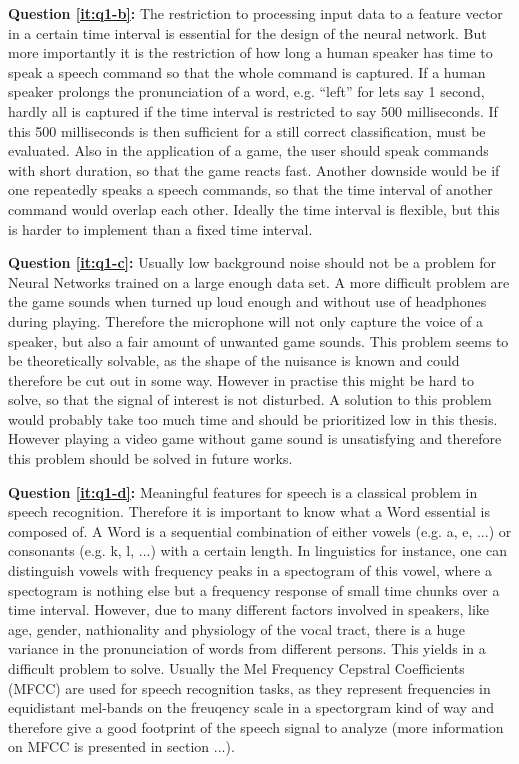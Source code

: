 \textbf{Question \ref{it:q1-b}:} 
The restriction to processing input data to a feature vector in a certain time interval is essential for the design of the neural network.
But more importantly it is the restriction of how long a human speaker has time to speak a speech command so that the whole command is captured. If a human speaker prolongs the pronunciation of a word, e.g. \enquote{left} for lets say 1 second, hardly all is captured if the time interval is restricted to say 500 milliseconds. If this 500 milliseconds is then sufficient for a still correct classification, must be evaluated. 
Also in the application of a game, the user should speak commands with short duration, so that the game reacts fast. Another downside would be if one repeatedly speaks a speech commands, so that the time interval of another command would overlap each other. Ideally the time interval is flexible, but this is harder to implement than a fixed time interval.

\textbf{Question \ref{it:q1-c}:}
Usually low background noise should not be a problem for Neural Networks trained on a large enough data set. 
A more difficult problem are the game sounds when turned up loud enough and without use of headphones during playing. 
Therefore the microphone will not only capture the voice of a speaker, but also a fair amount of unwanted game sounds. 
This problem seems to be theoretically solvable, as the shape of the nuisance is known and could therefore be cut out in some way. 
However in practise this might be hard to solve, so that the signal of interest is not disturbed. 
A solution to this problem would probably take too much time and should be prioritized low in this thesis. 
However playing a video game without game sound is unsatisfying and therefore this problem should be solved in future works.

\textbf{Question \ref{it:q1-d}:} 
Meaningful features for speech is a classical problem in speech recognition.
Therefore it is important to know what a Word essential is composed of. A Word is a sequential combination of either vowels (e.g. a, e, ...) or consonants (e.g. k, l, ...) with a certain length. In linguistics for instance, one can distinguish vowels with frequency peaks in a spectogram of this vowel, where a spectogram is nothing else but a frequency response of small time chunks over a time interval. 
However, due to many different factors involved in speakers, like age, gender, nathionality and physiology of the vocal tract, there is a huge variance in the pronunciation of words from different persons. 
This yields in a difficult problem to solve. 
Usually the Mel Frequency Cepstral Coefficients (MFCC) are used for speech recognition tasks, as they represent frequencies in equidistant mel-bands on the freuqency scale in a spectorgram kind of way and therefore give a good footprint of the speech signal to analyze (more information on MFCC is presented in section ...).

